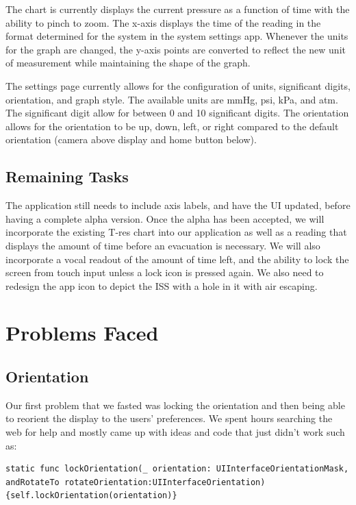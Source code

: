 \documentclass[onecolumn, draftclsnofoot,10pt, compsoc]{IEEEtran}
\begin{document}
    The chart is currently displays the current pressure as a function of time with the ability to pinch to zoom.
    The x-axis displays the time of the reading in the format determined for the system in the system settings app.
    Whenever the units for the graph are changed, the y-axis points are converted to reflect the new unit of measurement while maintaining the shape of the graph.

    The settings page currently allows for the configuration of units, significant digits, orientation, and graph style.
    The available units are mmHg, psi, kPa, and atm.
    The significant digit allow for between 0 and 10 significant digits.
    The orientation allows for the orientation to be up, down, left, or right compared to the default orientation (camera above display and home button below).

    \subsection{Remaining Tasks}
        The application still needs to include axis labels, and have the UI updated, before having a complete alpha version.
        Once the alpha has been accepted, we will incorporate the existing T-res chart into our application as well as a reading that displays the amount of time before an evacuation is necessary.
        We will also incorporate a vocal readout of the amount of time left, and the ability to lock the screen from touch input unless a lock icon is pressed again.
        We also need to redesign the app icon to depict the ISS with a hole in it with air escaping.

\section{Problems Faced}

\subsection{Orientation} 
Our first problem that we fasted was locking the orientation and then being able to reorient the display to the users’ preferences.
We spent hours searching the web for help and mostly came up with ideas and code that just didn't work such as:

\begin{lstlisting}
static func lockOrientation(_ orientation: UIInterfaceOrientationMask, andRotateTo rotateOrientation:UIInterfaceOrientation) {self.lockOrientation(orientation)}
\end{lstlisting}
\end{document}
